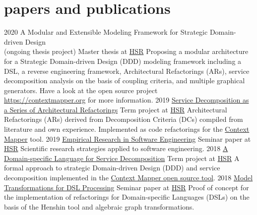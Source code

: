 \documentclass[]{cv-style}
\begin{document}
\section{papers and publications}

\begin{entrylist}
\entry
{2020}
{A Modular and Extensible Modeling Framework for Strategic Domain-driven Design \\(ongoing thesis project)}
{Master thesis at \href{https://www.hsr.ch}{HSR}}
{Proposing a modular architecture for a Strategic Domain-driven Design (DDD) modeling framework including a DSL, a reverse engineering framework, Architectural Refactorings (ARs), service decomposition analysis on the basis of coupling criteria, and multiple graphical generators. Have a look at the open source project \\ \href{https://contextmapper.org}{https://contextmapper.org} for more information.}
\entry
{2019}
{\href{https://eprints.hsr.ch/784/}{Service Decomposition as a Series of Architectural Refactorings}}
{Term project at \href{https://www.hsr.ch}{HSR}}
{Architectural Refactorings (ARs) derived from Decomposition Criteria (DCs) compiled from literature and own experience. Implemented as code refactorings for the \href{https://contextmapper.org/}{Context Mapper} tool.}
\entry
{2019}
{\href{https://github.com/stefan-ka/papers-and-publications/raw/master/empirical-research-in-software-engineering/FS19_SKapferer_Empirical-Research-in-Software-Engineering-Paper.pdf}{Empirical Research in Software Engineering}}
{Seminar paper at \href{https://www.hsr.ch}{HSR}}
{Scientific research strategies applied to software engineering.}
\entry
{2018}
{\href{https://eprints.hsr.ch/722/}{A Domain-specific Language for Service Decomposition}}
{Term project at \href{https://www.hsr.ch}{HSR}}
{A formal approach to strategic Domain-driven Design (DDD) and service decomposition implemented in the \href{https://contextmapper.org/}{Context Mapper open source tool}.}
\entry
{2018}
{\href{https://stefan.kapferer.ch/model-transformations-for-dsl-processing}{Model Transformations for DSL Processing}}
{Seminar paper at \href{https://www.hsr.ch}{HSR}}
{Proof of concept for the implementation of refactorings for Domain-specific Languages (DSLs) on the basis of the Henshin tool and algebraic graph transformations.}

\end{entrylist}
\end{document}
